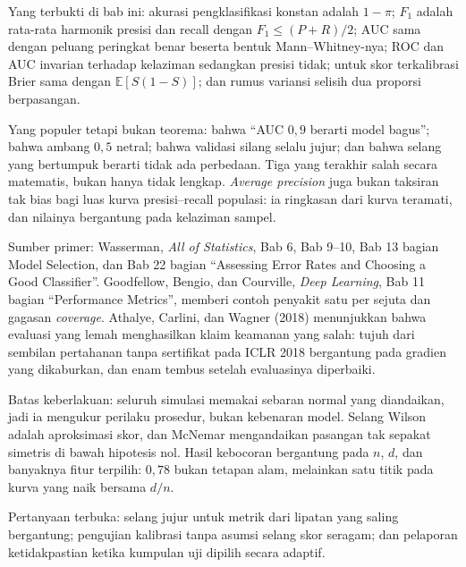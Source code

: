 \begin{untukpeneliti}
Yang terbukti di bab ini: akurasi pengklasifikasi konstan adalah $1-\pi$; $F_1$ adalah
rata-rata harmonik presisi dan recall dengan $F_1\le(P+R)/2$; AUC sama dengan peluang
peringkat benar beserta bentuk Mann--Whitney-nya; ROC dan AUC invarian terhadap kelaziman
sedangkan presisi tidak; untuk skor terkalibrasi Brier sama dengan $\mathbb{E}[S(1-S)]$;
dan rumus variansi selisih dua proporsi berpasangan.

Yang populer tetapi bukan teorema: bahwa ``AUC $0{,}9$ berarti model bagus''; bahwa ambang
$0{,}5$ netral; bahwa validasi silang selalu jujur; dan bahwa selang yang bertumpuk berarti
tidak ada perbedaan. Tiga yang terakhir salah secara matematis, bukan hanya tidak lengkap.
\emph{Average precision} juga bukan taksiran tak bias bagi luas kurva presisi--recall
populasi: ia ringkasan dari kurva teramati, dan nilainya bergantung pada kelaziman sampel.

Sumber primer: Wasserman, \emph{All of Statistics}, Bab 6, Bab 9--10, Bab 13 bagian
Model Selection, dan Bab 22 bagian ``Assessing Error Rates and Choosing a Good Classifier''.
Goodfellow, Bengio, dan Courville, \emph{Deep Learning}, Bab 11 bagian ``Performance
Metrics'', memberi contoh penyakit satu per sejuta dan gagasan \emph{coverage}. Athalye,
Carlini, dan Wagner (2018) menunjukkan bahwa evaluasi yang lemah menghasilkan klaim
keamanan yang salah: tujuh dari sembilan pertahanan tanpa sertifikat pada ICLR 2018
bergantung pada gradien yang dikaburkan, dan enam tembus setelah evaluasinya diperbaiki.

Batas keberlakuan: seluruh simulasi memakai sebaran normal yang diandaikan, jadi ia
mengukur perilaku prosedur, bukan kebenaran model. Selang Wilson adalah aproksimasi
skor, dan McNemar mengandaikan pasangan tak sepakat simetris di bawah hipotesis nol.
Hasil kebocoran bergantung pada $n$, $d$, dan banyaknya fitur terpilih: $0{,}78$
bukan tetapan alam, melainkan satu titik pada kurva yang naik bersama $d/n$.

Pertanyaan terbuka: selang jujur untuk metrik dari lipatan yang saling bergantung;
pengujian kalibrasi tanpa asumsi selang skor seragam; dan pelaporan ketidakpastian ketika
kumpulan uji dipilih secara adaptif.
\end{untukpeneliti}

